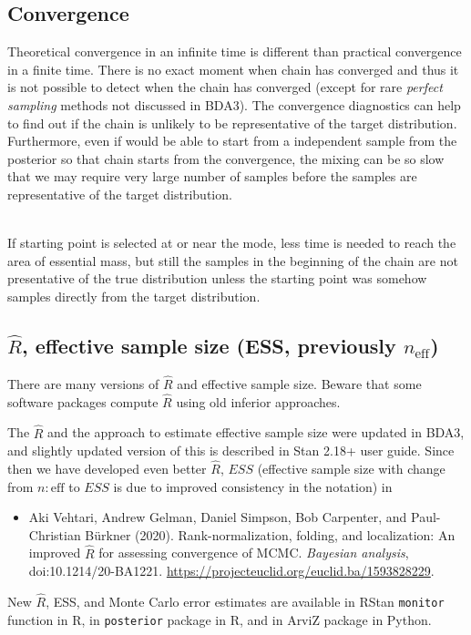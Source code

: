 \documentclass[a4paper,11pt,english]{article}
\def\eff{\mathrm{eff}}
\begin{document}
\subsection*{Convergence}

Theoretical convergence in an infinite time is different than
practical convergence in a finite time. There is no exact moment when
chain has converged and thus it is not possible to detect when the
chain has converged (except for rare \emph{perfect sampling} methods
not discussed in BDA3). The convergence diagnostics can help to find
out if the chain is unlikely to be representative of the target
distribution. Furthermore, even if would be able to start from a
independent sample from the posterior so that chain starts from the
convergence, the mixing can be so slow that we may require very large
number of samples before the samples are representative of the target
distribution.

~\\
If starting point is selected at or near the mode, less time is needed
to reach the area of essential mass, but still the samples in the
beginning of the chain are not presentative of the true distribution
unless the starting point was somehow samples directly from the target
distribution. 

\subsection*{$\widehat{R}$, effective sample size (ESS, previously $n_\eff$)}

There are many versions of $\widehat{R}$ and effective sample size. Beware
that some software packages compute $\widehat{R}$ using old inferior
approaches.

The $\hat{R}$ and the approach to estimate effective sample size were
updated in BDA3, and slightly updated version of this is described in
Stan 2.18+ user guide. Since then we have developed even better
$\hat{R}$, $ESS$ (effective sample size with change from
$n:\eff$ to $ESS$ is due to improved consistency in the notation) in
 \begin{itemize}
 \item Aki Vehtari, Andrew Gelman, Daniel Simpson, Bob Carpenter, and
   Paul-Christian Bürkner (2020). Rank-normalization, folding, and
   localization: An improved $\widehat{R}$ for assessing convergence of
   MCMC.  {\em Bayesian analysis}, doi:10.1214/20-BA1221. \url{https://projecteuclid.org/euclid.ba/1593828229}.
 \end{itemize}
 New $\hat{R}$, ESS, and Monte Carlo error estimates are available in
 RStan {\tt monitor} function in R, in {\tt posterior} package in R,
 and in ArviZ package in Python.
 
\end{document}
